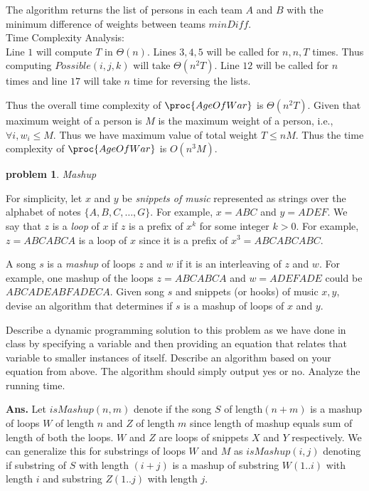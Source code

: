 \documentclass[11pt]{article}
\newtheorem{problem}{\sc\color{cit}problem}
\begin{document}
The algorithm returns the list of persons in each team $A$ and $B$ with the minimum difference of weights between teams $minDiff$.\\

Time Complexity Analysis:\\
Line $1$ will compute $T$ in $\Theta(n)$. Lines $3,4,5$ will be called for $n,n,T$ times. Thus computing $Possible(i,j,k)$ will take $\Theta(n^2T)$. Line $12$ will be called for $n$ times and line $17$ will take $n$ time for reversing the lists. 

Thus the overall time complexity of $\proc{AgeOfWar}$ is $\Theta(n^2T)$. Given that maximum weight of a person is $M$ is the maximum weight of a person, i.e., $\forall i, w_i\leq M$. Thus we have maximum value of total weight $T \leq nM$. Thus the time complexity of $\proc{AgeOfWar}$ is $O(n^3M)$.
\newpage

\begin{problem} Mashup\end{problem}
For simplicity, let $x$ and $y$
be {\em snippets of music} represented as strings over the alphabet of notes $\{A,B,C,\ldots,G\}$.
For example, $x=ABC$ and $y=ADEF$.   We say that $z$ is a
{\em loop} of $x$ if $z$ is a prefix of $x^k$ for some integer $k>0$.  For example,
$z=ABCABCA$ is a loop of $x$ since it is a prefix of $x^3 = ABCABCABC$.

A song $s$ is a {\em mashup} of loops $z$ and $w$ if it is an interleaving of $z$ and $w$. For example, one mashup of the loops $z=ABCABCA$ and $w=ADEFADE$ could be $ABCADEABFADECA$. 
Given song $s$ and snippets (or hooks) of music $x,y$, devise an algorithm
that determines if $s$ is a mashup of loops of $x$ and $y$.  

Describe a dynamic programming solution to this problem as we have done in class by specifying a  variable and then providing an equation that relates that variable to smaller instances of itself. Describe an algorithm based on your equation from above.  The algorithm should simply output yes or no. Analyze the running time.


\hfill
   
\noindent \textbf{Ans.}
Let $isMashup(n, m)$ denote if the song $S$ of length$(n+m)$ is a mashup of loops $W$ of length $n$ and $Z$ of length $m$ since length of mashup equals sum of length of both the loops. $W$ and $Z$ are loops of snippets $X$ and $Y$ respectively. We can generalize this for substrings of loops $W$ and $M$ as $isMashup(i,j)$ denoting if substring of $S$ with length $(i+j)$ is a mashup of substring $W(1..i)$ with length $i$ and  substring $Z(1..j)$ with length $j$.\\
\end{document}
